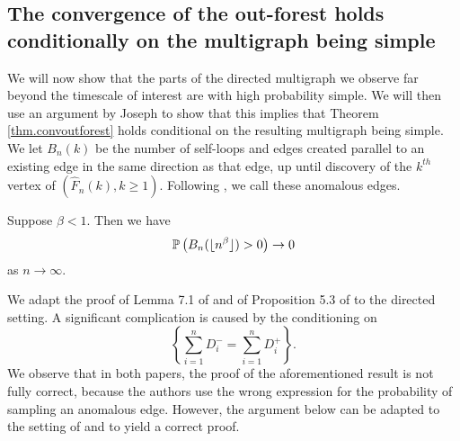 \subsection{The convergence of the out-forest holds conditionally on the multigraph being simple}
We will now show that the parts of the directed multigraph we observe far beyond the timescale of interest are with high probability simple. We will then use an argument by Joseph \cite{josephComponentSizesCritical2014} to show that this implies that Theorem \ref{thm.convoutforest} holds conditional on the resulting multigraph being simple. We let $B_n(k)$ be the number of self-loops and edges created parallel to an existing edge in the same direction as that edge, up until discovery of the $k^{th}$ vertex of $(\hat{F}_n(k),k\geq 1)$. Following \cite{conchon--kerjanStableGraphMetric2020}, we call these anomalous edges. 
\begin{proposition}\label{prop.anomalousedges}
Suppose $\beta<1$. Then we have
$$\P\left(B_n(\lfloor n^\beta \rfloor)>0\right)\to 0$$
as $n\to \infty$.
\end{proposition}
\begin{remark}
We adapt the proof of Lemma 7.1 of \cite{josephComponentSizesCritical2014} and of Proposition 5.3 of \cite{conchon--kerjanStableGraphMetric2020} to the directed setting. A significant complication is caused by the conditioning on $$\left\{\sum_{i=1}^n D^-_i=\sum_{i=1}^n D^+_i\right\}.$$ We observe that in both papers, the proof of the aforementioned result is not fully correct, because the authors use the wrong expression for the probability of sampling an anomalous edge. However, the argument below can be adapted to the setting of \cite{josephComponentSizesCritical2014} and \cite{conchon--kerjanStableGraphMetric2020} to yield a correct proof.
\end{remark}
